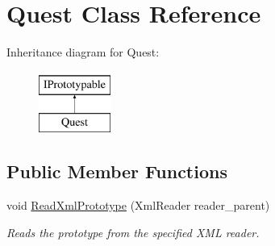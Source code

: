 \hypertarget{class_quest}{}\section{Quest Class Reference}
\label{class_quest}
Inheritance diagram for Quest\+:\begin{figure}[H]
\begin{center}
\leavevmode
\includegraphics[height=2.000000cm]{class_quest}
\end{center}
\end{figure}
\subsection*{Public Member Functions}
\begin{DoxyCompactItemize}
\item 
void \hyperlink{class_quest_a236e119719eaaed9e39874c3d7fdac68}{Read\+Xml\+Prototype} (Xml\+Reader reader\+\_\+parent)
\begin{DoxyCompactList}\small\item\em Reads the prototype from the specified X\+ML reader. \end{DoxyCompactList}\end{DoxyCompactItemize}
